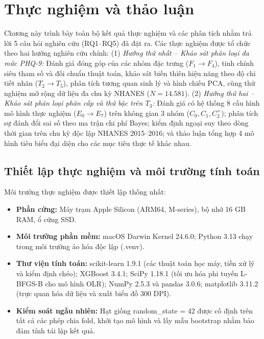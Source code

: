 \chapter{Thực nghiệm và thảo luận}
\label{ch:thuc-nghiem}

Chương này trình bày toàn bộ kết quả thực nghiệm và các phân tích nhằm trả lời 5 câu hỏi nghiên cứu (RQ1--RQ5) đã đặt ra. Các thực nghiệm được tổ chức theo hai hướng nghiên cứu chính:
(1) \textit{Hướng thứ nhất -- Khảo sát phân loại đa mức PHQ-9:} Đánh giá đóng góp của các nhóm đặc trưng ($F_1 \to F_4$), tinh chỉnh siêu tham số và đối chuẩn thuật toán, khảo sát biến thiên hiệu năng theo độ chi tiết nhãn ($T_2 \to T_5$), phân tích tương quan sinh lý và hình chiếu PCA, cùng thử nghiệm mở rộng dữ liệu đa chu kỳ NHANES ($N = 14.581$).
(2) \textit{Hướng thứ hai -- Khảo sát phân loại phân cấp và thứ bậc trên $T_3$:} Đánh giá có hệ thống 8 cấu hình mô hình thực nghiệm ($E_0 \to E_7$) trên không gian 3 nhóm ($C_0, C_1, C_2^+$); phân tích sự đánh đổi sai số theo ma trận chi phí Bayes; kiểm định ngoại suy theo dòng thời gian trên chu kỳ độc lập NHANES 2015--2016; và thảo luận tổng hợp 4 mô hình tiêu biểu đại diện cho các mục tiêu thực tế khác nhau.

\section{Thiết lập thực nghiệm và môi trường tính toán}
\label{sec:moi-truong-thuc-nghiem}

Môi trường thực nghiệm được thiết lập thống nhất:
\begin{itemize}
    \item \textbf{Phần cứng:} Máy trạm Apple Silicon (ARM64, M-series), bộ nhớ 16 GB RAM, ổ cứng SSD.
    \item \textbf{Môi trường phần mềm:} macOS Darwin Kernel 24.6.0; Python 3.13 chạy trong môi trường ảo hóa độc lập (.venv).
    \item \textbf{Thư viện tính toán:} scikit-learn 1.9.1 (các thuật toán học máy, tiền xử lý và kiểm định chéo); XGBoost 3.4.1; SciPy 1.18.1 (tối ưu hóa phi tuyến L-BFGS-B cho mô hình OLR); NumPy 2.5.3 và pandas 3.0.6; matplotlib 3.11.2 (trực quan hóa dữ liệu và xuất biểu đồ 300 DPI).
    \item \textbf{Kiểm soát ngẫu nhiên:} Hạt giống \textnormal{random\_state = 42} được cố định trên tất cả các phép chia fold, khởi tạo mô hình và lấy mẫu bootstrap nhằm bảo đảm tính tái lập kết quả.
\end{itemize}

